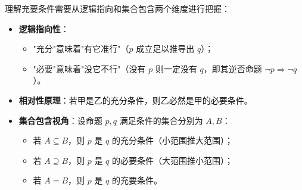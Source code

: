 \begin{explanationbox}
理解充要条件需要从逻辑指向和集合包含两个维度进行把握：
\begin{itemize}
    \item \textbf{逻辑指向性}：
    \begin{itemize}
        \item "充分"意味着"有它准行"（$p$ 成立足以推导出 $q$）；
        \item "必要"意味着"没它不行"（没有 $p$ 则一定没有 $q$，即其逆否命题 $\neg p \Rightarrow \neg q$）。
    \end{itemize}
    \item \textbf{相对性原理}：若甲是乙的充分条件，则乙必然是甲的必要条件。
    \item \textbf{集合包含视角}：设命题 $p, q$ 满足条件的集合分别为 $A, B$：
    \begin{itemize}
        \item 若 $A \subseteq B$，则 $p$ 是 $q$ 的充分条件（小范围推大范围）；
        \item 若 $A \supseteq B$，则 $p$ 是 $q$ 的必要条件（大范围推小范围）；
        \item 若 $A = B$，则 $p$ 是 $q$ 的充要条件。
    \end{itemize}
\end{itemize}
\end{explanationbox}